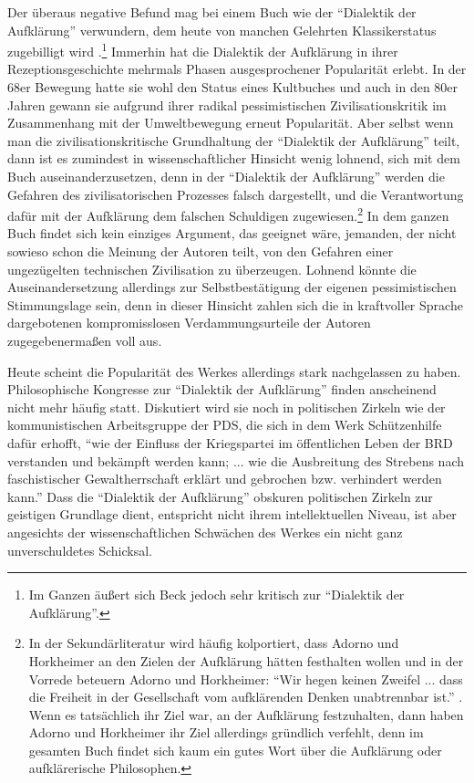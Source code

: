 \documentclass[12pt,a4paper,ngerman]{article}
\begin{document}
Der überaus negative Befund mag bei einem Buch wie der "`Dialektik der
Aufklärung"' verwundern, dem heute von manchen Gelehrten Klassikerstatus
zugebilligt wird \cite[]{beck:1998}.\footnote{Im Ganzen äußert sich Beck
jedoch sehr kritisch zur "`Dialektik der Aufklärung"'.} Immerhin hat die
Dialektik der Aufklärung in ihrer Rezeptionsgeschichte mehrmals Phasen
ausgesprochener Popularität erlebt. In der 68er Bewegung hatte sie wohl den
Status eines Kultbuches und auch in den 80er Jahren gewann sie aufgrund ihrer
radikal pessimistischen Zivilisationskritik im Zusammenhang mit der
Umweltbewegung erneut Popularität. Aber selbst wenn man die
zivilisationskritische Grundhaltung der "`Dialektik der Aufklärung"' teilt,
dann ist es zumindest in wissenschaftlicher Hinsicht wenig lohnend, sich mit
dem Buch auseinanderzusetzen, denn in der "`Dialektik der Aufklärung"' werden
die Gefahren des zivilisatorischen Prozesses falsch dargestellt, und die
Verantwortung dafür mit der Aufklärung dem falschen Schuldigen
zugewiesen.\footnote{In der Sekundärliteratur wird häufig kolportiert, dass
Adorno und Horkheimer an den Zielen der Aufklärung hätten festhalten wollen
\cite[S. 31]{schnaedelbach:1989} und in der Vorrede beteuern Adorno und
Horkheimer: "`Wir hegen keinen Zweifel ... dass die Freiheit in der
Gesellschaft vom aufklärenden Denken unabtrennbar ist."'
\cite[S. 3]{adorno-horkheimer:1947}. Wenn es tatsächlich ihr Ziel war, an
der Aufklärung festzuhalten, dann haben Adorno und Horkheimer ihr Ziel
allerdings gründlich verfehlt, denn im gesamten Buch findet sich kaum ein
gutes Wort über die Aufklärung oder aufklärerische Philosophen.} In dem ganzen
Buch findet sich kein einziges Argument, das geeignet wäre, jemanden, der
nicht sowieso schon die Meinung der Autoren teilt, von den Gefahren einer
ungezügelten technischen Zivilisation zu überzeugen. Lohnend könnte die
Auseinandersetzung allerdings zur Selbstbestätigung der eigenen
pessimistischen Stimmungslage sein, denn in dieser Hinsicht zahlen sich die in
kraftvoller Sprache dargebotenen kompromisslosen Verdammungsurteile der
Autoren zugegebenermaßen voll aus.

Heute scheint die Popularität des Werkes allerdings stark nachgelassen zu
haben. Philosophische Kongresse zur "`Dialektik der Aufklärung"' finden
anscheinend nicht mehr häufig statt. Diskutiert wird sie noch in politischen
Zirkeln wie der kommunistischen Arbeitsgruppe der PDS, die sich in dem Werk
Schützenhilfe dafür erhofft, "`wie der Einfluss der Kriegspartei im
öffentlichen Leben der BRD verstanden und bekämpft werden kann; ... wie die
Ausbreitung des Strebens nach faschistischer Gewaltherrschaft erklärt und
gebrochen bzw. verhindert werden kann."' \cite[]{kag} Dass die "`Dialektik
der Aufklärung"' obskuren politischen Zirkeln zur geistigen Grundlage dient,
entspricht nicht ihrem intellektuellen Niveau, ist aber angesichts der
wissenschaftlichen Schwächen des Werkes ein nicht ganz unverschuldetes
Schicksal.
\end{document}
